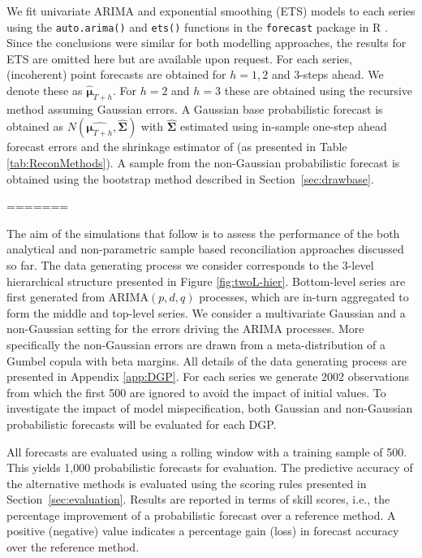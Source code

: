 \documentclass[12pt]{article}
\theoremstyle{definition}
\begin{document}
We fit univariate ARIMA and exponential smoothing (ETS) models to each series using the \verb|auto.arima()| and \verb|ets()| functions in the \verb|forecast| package \citep{Rforecast} in R \citep{Rcore}.  Since the conclusions were similar for both modelling approaches, the results for ETS are omitted here but are available upon request.  For each series, (incoherent) point forecasts are obtained for $h = 1, 2$ and $3$-steps ahead.  We denote these as $\hat{\bm\mu}_{T+h}$. For $h=2$ and $h=3$ these are obtained using the recursive method \citep{FPP2018} assuming Gaussian errors.  A Gaussian base probabilistic forecast is obtained as $N(\hat{\bm{\mu}_{T+h}},\hat{\bm{\Sigma}})$ with $\hat{\bm{\Sigma}}$ estimated using in-sample one-step ahead forecast errors and the shrinkage estimator of \citet{Schafer2005} (as presented in Table \ref{tab:ReconMethods}).  A sample from the non-Gaussian probabilistic forecast is obtained using the bootstrap method described in Section~\ref{sec:drawbase}.

=======

The aim of the simulations that follow is to assess the performance of the  both analytical and non-parametric sample based reconciliation approaches discussed so far. The data generating process we consider corresponds to the 3-level hierarchical structure presented in Figure \ref{fig:twoL-hier}. Bottom-level series are first generated from ARIMA$(p,d,q)$ processes, which are in-turn aggregated to form the middle and top-level series. We consider a multivariate Gaussian and a non-Gaussian setting for the errors driving the ARIMA processes. More specifically the non-Gaussian errors are drawn from a meta-distribution of a Gumbel copula with beta margins. All details of the data generating process are presented in Appendix \ref{app:DGP}.  For each series we generate 2002 observations from which the first 500 are ignored to avoid the impact of initial values. To investigate the impact of model mispecification, both Gaussian and non-Gaussian probabilistic forecasts will be evaluated for each DGP.

All forecasts are evaluated using a rolling window with a training sample of 500. This yields 1,000 probabilistic forecasts for evaluation. The predictive accuracy of the alternative methods is evaluated using the scoring rules presented in Section~\ref{sec:evaluation}. Results are reported in terms of skill scores, i.e., the percentage improvement of a probabilistic forecast over a reference method. A positive (negative) value indicates a percentage gain (loss) in forecast accuracy over the reference method.
\end{document}
